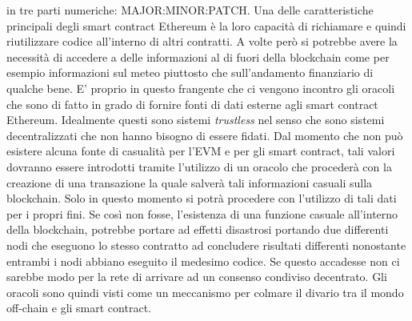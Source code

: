 in tre parti numeriche: MAJOR:MINOR:PATCH. Una delle caratteristiche principali degli smart contract Ethereum è la loro capacità di richiamare e quindi riutilizzare codice all'interno di altri contratti. A volte però si potrebbe avere la necessità di accedere a delle informazioni al di fuori della blockchain come per esempio informazioni sul meteo piuttosto che sull'andamento finanziario di qualche bene. E' proprio in questo frangente che ci vengono incontro gli oracoli che sono di fatto in grado di fornire fonti di dati esterne agli smart contract Ethereum. Idealmente questi sono sistemi \textit{trustless} nel senso che sono sistemi decentralizzati che non hanno bisogno di essere fidati. Dal momento che non può esistere alcuna fonte di casualità per l'EVM e per gli smart contract, tali valori dovranno essere introdotti tramite l'utilizzo di un oracolo che procederà con la creazione di una transazione la quale salverà tali informazioni casuali sulla blockchain. Solo in questo momento si potrà procedere con l'utilizzo di tali dati per i propri fini. Se così non fosse, l'esistenza di una funzione casuale all'interno della blockchain, potrebbe portare ad effetti disastrosi portando due differenti nodi che eseguono lo stesso contratto ad concludere risultati differenti nonostante entrambi i nodi abbiano eseguito il medesimo codice. Se questo accadesse non ci sarebbe modo per la rete di arrivare ad un consenso condiviso decentrato. Gli oracoli sono quindi visti come un meccanismo per colmare il divario tra il mondo off-chain e gli smart contract.

